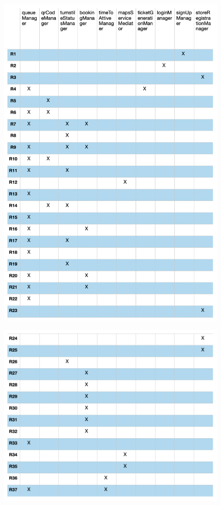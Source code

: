 \documentclass{article}
\begin{document}
\begin{figure}[H]
  \includegraphics[width=\linewidth]{traceability1.png}
  
\end{figure}

\begin{figure}[H]
  \includegraphics[width=\linewidth]{traceability2.png}
  
\end{figure}
\end{document}
